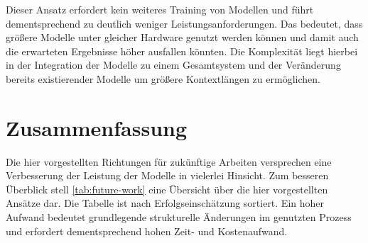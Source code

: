 Dieser Ansatz erfordert kein weiteres Training von Modellen und führt dementsprechend zu deutlich weniger Leistungsanforderungen. Das bedeutet, dass größere Modelle unter gleicher Hardware genutzt werden können und damit auch die erwarteten Ergebnisse höher ausfallen könnten. Die Komplexität liegt hierbei in der Integration der Modelle zu einem Gesamtsystem und der Veränderung bereits existierender Modelle um größere Kontextlängen zu ermöglichen.

\section{Zusammenfassung}
Die hier vorgestellten Richtungen für zukünftige Arbeiten versprechen eine Verbesserung der Leistung der Modelle in vielerlei Hinsicht.
Zum besseren Überblick stell \cref{tab:future-work} eine Übersicht über die hier vorgestellten Ansätze dar.
Die Tabelle ist nach Erfolgseinschätzung sortiert.
Ein hoher Aufwand bedeutet grundlegende strukturelle Änderungen im genutzten Prozess und erfordert dementsprechend hohen Zeit- und Kostenaufwand.

\begin{table}
    \centering
    \caption{Übersicht über mögliche Ansätze zur Verbesserung der Leistung der Modelle}\label{tab:future-work}
\end{table}
